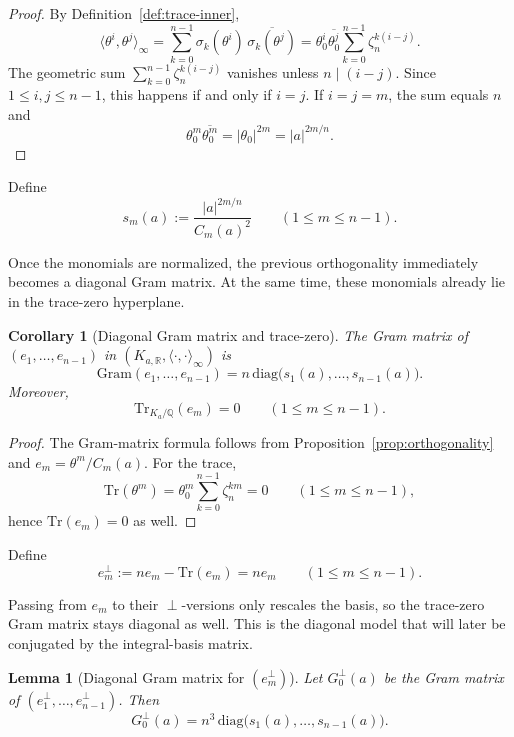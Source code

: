\documentclass[11pt,letterpaper]{amsart}
\newcommand{\Q}{\mathbb{Q}}
\newcommand{\R}{\mathbb{R}}
\newcommand{\Tr}{\mathrm{Tr}}
\newcommand{\diag}{\mathrm{diag}}
\theoremstyle{plain}
\newtheorem{lemma}[theorem]{Lemma}
\newtheorem{corollary}[theorem]{Corollary}
\theoremstyle{definition}
\begin{document}
\begin{proof}
By Definition~\ref{def:trace-inner},
\[
\langle \theta^i,\theta^j\rangle_\infty
=\sum_{k=0}^{n-1}\sigma_k(\theta^i)\,\overline{\sigma_k(\theta^j)}
=\theta_0^i\overline{\theta_0^j}\sum_{k=0}^{n-1}\zeta_n^{k(i-j)}.
\]
The geometric sum $\sum_{k=0}^{n-1}\zeta_n^{k(i-j)}$ vanishes unless $n\mid(i-j)$.
Since $1\le i,j\le n-1$, this happens if and only if $i=j$.
If $i=j=m$, the sum equals $n$ and
\[
\theta_0^m\overline{\theta_0^m}=|\theta_0|^{2m}=|a|^{2m/n}.
\]
\end{proof}

Define
\begin{equation}\label{eq:sm-def}
s_m(a):=\frac{|a|^{2m/n}}{C_m(a)^2}\qquad(1\le m\le n-1).
\end{equation}

Once the monomials are normalized, the previous orthogonality immediately becomes a diagonal Gram matrix. At the same time, these monomials already lie in the trace-zero hyperplane.


\begin{corollary}[Diagonal Gram matrix and trace-zero]\label{cor:diag-gram}
The Gram matrix of $(e_1,\dots,e_{n-1})$ in $(K_{a,\R},\langle\cdot,\cdot\rangle_\infty)$ is
\begin{equation}\label{eq:diag-gram}
\mathrm{Gram}(e_1,\dots,e_{n-1})=n\,\diag\bigl(s_1(a),\dots,s_{n-1}(a)\bigr).
\end{equation}
Moreover,
\[
\Tr_{K_a/\Q}(e_m)=0\qquad(1\le m\le n-1).
\]
\end{corollary}

\begin{proof}
The Gram-matrix formula follows from Proposition~\ref{prop:orthogonality} and $e_m=\theta^m/C_m(a)$.
For the trace,
\[
\Tr(\theta^m)=\theta_0^m\sum_{k=0}^{n-1}\zeta_n^{km}=0
\qquad(1\le m\le n-1),
\]
hence $\Tr(e_m)=0$ as well.
\end{proof}

Define
\[
e_m^\perp:=n e_m-\Tr(e_m)=n e_m\qquad(1\le m\le n-1).
\]

Passing from \(e_m\) to their \(\perp\)-versions only rescales the basis, so the trace-zero Gram matrix stays diagonal as well. This is the diagonal model that will later be conjugated by the integral-basis matrix.

\begin{lemma}[Diagonal Gram matrix for $(e_m^\perp)$]\label{lem:G0perp}
Let $G_0^\perp(a)$ be the Gram matrix of $(e_1^\perp,\dots,e_{n-1}^\perp)$.
Then
\begin{equation}\label{eq:G0perp}
G_0^\perp(a)=n^3\,\diag\bigl(s_1(a),\dots,s_{n-1}(a)\bigr).
\end{equation}
\end{lemma}
\end{document}
